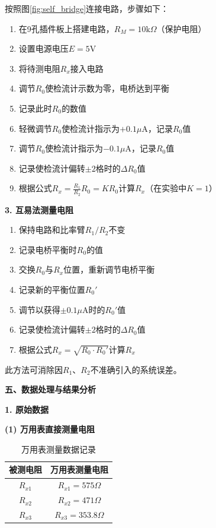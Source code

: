 ﻿\documentclass[12pt,a4paper]{article}
\begin{document}
按照图\ref{fig:self_bridge}连接电路，步骤如下：
\begin{enumerate}
    \item 在9孔插件板上搭建电路，$R_M = 10\mathrm{k}\Omega$（保护电阻）
    \item 设置电源电压$E = 5\mathrm{V}$
    \item 将待测电阻$R_x$接入电路
    \item 调节$R_0$使检流计示数为零，电桥达到平衡
    \item 记录此时$R_0$的数值
    \item 轻微调节$R_0$使检流计指示为$+0.1\mu\mathrm{A}$，记录$R_0$值
    \item 调节$R_0$使检流计指示为$-0.1\mu\mathrm{A}$，记录$R_0$值
    \item 记录使检流计偏转$\pm2$格时的$\Delta R_0$值
    \item 根据公式$R_x = \frac{R_1}{R_2}R_0 = KR_0$计算$R_x$（在实验中$K=1$）
\end{enumerate}

\textbf{3. 互易法测量电阻}

\begin{enumerate}
    \item 保持电路和比率臂$R_1/R_2$不变
    \item 记录电桥平衡时$R_0$的值
    \item 交换$R_0$与$R_x$位置，重新调节电桥平衡
    \item 记录新的平衡位置$R_0'$
    \item 调节以获得$\pm0.1\mu\mathrm{A}$时的$R_0'$值
    \item 记录使检流计偏转$\pm2$格时的$\Delta R_0$值
    \item 根据公式$R_x = \sqrt{R_0 \cdot R_0'}$计算$R_x$
\end{enumerate}

此方法可消除因$R_1$、$R_2$不准确引入的系统误差。

\textbf{五、数据处理与结果分析}

\textbf{1. 原始数据}

\textbf{(1) 万用表直接测量电阻}

\begin{table}[H]
    \centering
    \begin{tabular}{|c|c|}
        \hline
        被测电阻 & 万用表测量电阻 \\
        \hline
        $R_{x1}$ & $R_{x1}= 575\Omega$ \\
        \hline
        $R_{x2}$ & $R_{x2}= 471\Omega$ \\
        \hline
        $R_{x3}$ & $R_{x3}= 353.8\Omega$ \\
        \hline
    \end{tabular}
    \caption{万用表测量数据记录}
    \label{tab:multimeter}
\end{table}
\end{document}
